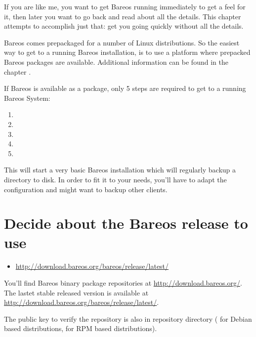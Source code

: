 If you are like me, you want to get Bareos running immediately to get a feel
for it, then later you want to go back and read about all the details. This
chapter attempts to accomplish just that: get you going quickly without all
the details.

Bareos comes prepackaged for a number of Linux distributions.
So the easiest way to get to a running Bareos installation, 
is to use a platform where prepacked Bareos packages are available.
Additional information can be found in the chapter .


If Bareos is available as a package, 
only 5 steps are required to get to a running Bareos System:
\begin{enumerate}
    \item {}
    \item {}
    \item {}
    \item {}
    \item {}
\end{enumerate}

This will start a very basic Bareos installation which will regularly backup a directory to disk.
In order to fit it to your needs, you'll have to adapt the configuration and might want to backup other clients.

\section{Decide about the Bareos release to use}
    \label{sec:AddSoftwareRepository}

\begin{itemize}
   \item \url{http://download.bareos.org/bareos/release/latest/}
\end{itemize}

You'll find Bareos binary package repositories at \url{http://download.bareos.org/}.
The lastet stable released version is available at \url{http://download.bareos.org/bareos/release/latest/}.

The public key to verify the repository is also in repository directory
( for Debian based distributions,  for RPM based distributions).


